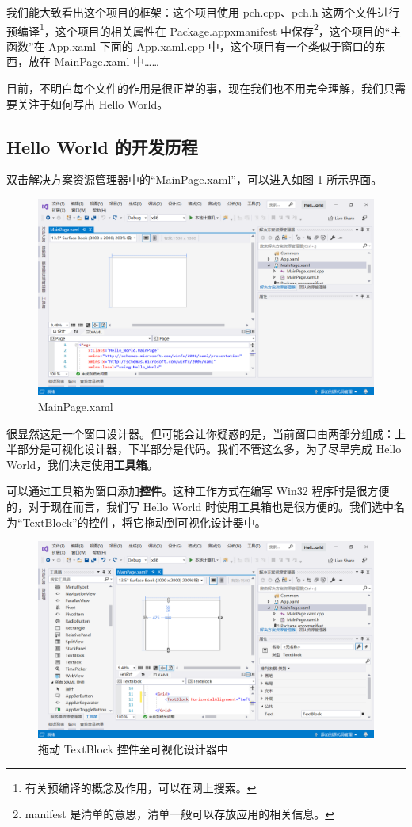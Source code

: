 我们能大致看出这个项目的框架：这个项目使用 pch.cpp、pch.h 这两个文件进行预编译\footnote{有关预编译的概念及作用，可以在网上搜索。}，这个项目的相关属性在 Package.appxmanifest 中保存\footnote{manifest 是清单的意思，清单一般可以存放应用的相关信息。}，这个项目的``主函数''在 App.xaml 下面的 App.xaml.cpp 中，这个项目有一个类似于窗口的东西，放在 MainPage.xaml 中……

目前，不明白每个文件的作用是很正常的事，现在我们也不用完全理解，我们只需要关注于如何写出 Hello World。

\subsection{Hello World 的开发历程}

双击解决方案资源管理器中的``MainPage.xaml''，可以进入如图 \ref{pic10} 所示界面。
\begin{figure}[htbp]
    \centering
    \includegraphics[width = 0.5\paperwidth]{pic/10.png}
    \caption{MainPage.xaml}
    \label{pic10}
\end{figure}

很显然这是一个窗口设计器。但可能会让你疑惑的是，当前窗口由两部分组成：上半部分是可视化设计器，下半部分是代码。我们不管这么多，为了尽早完成 Hello World，我们决定使用\textbf{工具箱}。

可以通过工具箱为窗口添加\textbf{控件}。这种工作方式在编写 Win32 程序时是很方便的，对于现在而言，我们写 Hello World 时使用工具箱也是很方便的。我们选中名为``TextBlock''的控件，将它拖动到可视化设计器中。
\begin{figure}[htbp]
    \centering
    \includegraphics[width = 0.5\paperwidth]{pic/11.png}
    \caption{拖动 TextBlock 控件至可视化设计器中}
\end{figure}

